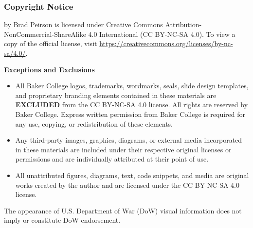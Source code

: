 \begin{frame}
    \frametitle{Copyright Notice}
    
    {\scriptsize
    \PresTitle {} by Brad Peirson is licensed under Creative Commons Attribution-NonCommercial-ShareAlike 4.0 International (CC BY-NC-SA 4.0). To view a copy of the official license, visit \href{https://creativecommons.org/licenses/by-nc-sa/4.0/}{https://creativecommons.org/licenses/by-nc-sa/4.0/}.

    \vspace{0.5em}

    \textbf{Exceptions and Exclusions}

    \begin{itemize}
        \item[Baker College Branding \& Trademarks:]All Baker College logos, trademarks, wordmarks, seals, slide design templates, and proprietary branding elements contained in these materials are \textbf{EXCLUDED} from the CC BY-NC-SA 4.0 license. All rights are reserved by Baker College. Express written permission from Baker College is required for any use, copying, or redistribution of these elements.
        \item[Third-Party Media \& Content:] Any third-party images, graphics, diagrams, or external media incorporated in these materials are included under their respective original licenses or permissions and are individually attributed at their point of use. 
        \item[Original Author Content:] All unattributed figures, diagrams, text, code snippets, and media are original works created by the author and are licensed under the CC BY-NC-SA 4.0 license.
    \end{itemize}

    The appearance of U.S. Department of War (DoW) visual information does not imply or constitute DoW endorsement.
    \par}
\end{frame}




